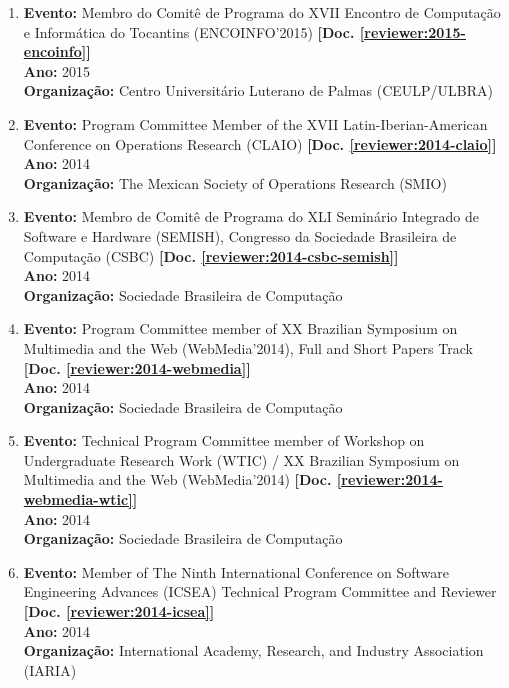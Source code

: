 \documentclass[a4paper,oneside,10pt]{article}
\begin{document}
\begin{enumerate}
\item \textbf{Evento:} Membro do Comitê de Programa do XVII Encontro de Computação e Informática do Tocantins (ENCOINFO'2015) \textbf{[Doc. \ref{reviewer:2015-encoinfo}]}\\
      \textbf{Ano:} 2015 \\
      \textbf{Organiza\c{c}\~{a}o:} Centro Universitário Luterano de Palmas (CEULP/ULBRA)

\item \textbf{Evento:} Program Committee Member of the XVII Latin-Iberian-American Conference on Operations Research (CLAIO) \textbf{[Doc. \ref{reviewer:2014-claio}]}\\
      \textbf{Ano:} 2014 \\
      \textbf{Organiza\c{c}\~{a}o:} The Mexican Society of Operations Research (SMIO)

\item \textbf{Evento:} Membro de Comitê de Programa do XLI Seminário Integrado de Software e Hardware (SEMISH), Congresso da Sociedade Brasileira de Computação (CSBC) \textbf{[Doc. \ref{reviewer:2014-csbc-semish}]}\\
      \textbf{Ano:} 2014 \\
      \textbf{Organiza\c{c}\~{a}o:} Sociedade Brasileira de Computa\c{c}\~{a}o

\item \textbf{Evento:} Program Committee member of XX Brazilian Symposium on Multimedia and the Web (WebMedia'2014), Full and Short Papers Track \textbf{[Doc. \ref{reviewer:2014-webmedia}]}\\
      \textbf{Ano:} 2014 \\
      \textbf{Organiza\c{c}\~{a}o:} Sociedade Brasileira de Computa\c{c}\~{a}o

\item \textbf{Evento:} Technical Program Committee member of Workshop on Undergraduate Research Work (WTIC) / XX Brazilian Symposium on Multimedia and the Web (WebMedia'2014) \textbf{[Doc. \ref{reviewer:2014-webmedia-wtic}]}\\
      \textbf{Ano:} 2014 \\
      \textbf{Organiza\c{c}\~{a}o:} Sociedade Brasileira de Computa\c{c}\~{a}o

\item \textbf{Evento:} Member of The Ninth International Conference on Software Engineering Advances (ICSEA) Technical Program Committee and Reviewer \textbf{[Doc. \ref{reviewer:2014-icsea}]}\\
      \textbf{Ano:} 2014 \\
      \textbf{Organiza\c{c}\~{a}o:} International Academy, Research, and Industry Association (IARIA)


\end{enumerate}
\end{document}
